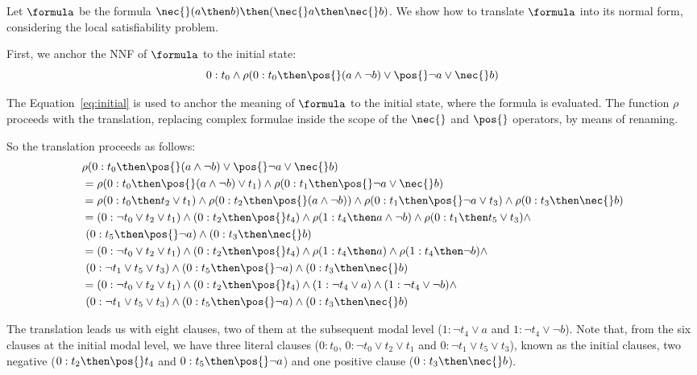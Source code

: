 \begin{example}%
    \label{ex:snf}
    Let $\formula$ be the formula $\nec{}(a \then b) \then (\nec{}a \then \nec{} b)$.
    We show how to translate $\formula$ into its normal form, considering the local
    satisfiability problem.

    First, we anchor the NNF of $\formula$ to the initial state:
    \begin{equation}
        \label{eq:initial}
        0 : t_0 \land \rho(0 : t_0 \then \pos{} (a \land \neg b) \lor \pos{} \neg a \lor \nec{} b)
    \end{equation}

    The Equation~\ref{eq:initial} is used to anchor the meaning of $\formula$ to
    the initial state, where the formula is evaluated. The function $\rho$
    proceeds with the translation, replacing complex formulae inside the
    scope of the $\nec{}$ and $\pos{}$ operators, by means of renaming. 

    So the translation proceeds as follows:
    \begin{align*}
        &\rho(0 : t_0 \then \pos{} (a \land \neg b) \lor \pos{} \neg a \lor \nec{} b) \\
        &= \rho(0: t_0 \then \pos{} (a \land \neg b) \lor t_1) \land \rho(0: t_1 \then \pos{} \neg a \lor \nec{} b) \\
        &= \rho(0: t_0 \then t_2 \lor t_1) \land \rho(0 : t_2 \then \pos {}(a \land \neg b)) \land \rho(0: t_1 \then \pos{} \neg a \lor t_3) \land \rho(0: t_3 \then \nec{} b) \\
        &= (0: \neg t_0 \lor t_2 \lor t_1) \land (0 : t_2 \then \pos {}t_4) \land \rho(1 : t_4 \then a \land \neg b) \land \rho(0: t_1 \then t_5 \lor t_3) \land \\
        &\ (0 : t_5 \then \pos{} \neg a) \land (0: t_3 \then \nec{} b) \\
        &= (0: \neg t_0 \lor t_2 \lor t_1) \land (0 : t_2 \then \pos {}t_4)
        \land \rho(1 : t_4 \then a) \land \rho(1 : t_4 \then \neg b) \land \\ 
        &\ (0: \neg t_1 \lor t_5 \lor t_3) \land (0 : t_5 \then \pos{} \neg a) \land (0: t_3 \then \nec{} b) \\
        &= (0: \neg t_0 \lor t_2 \lor t_1) \land (0 : t_2 \then \pos {}t_4)
        \land (1 : \neg t_4 \lor a) \land (1 : \neg t_4 \lor \neg b) \land \\ 
        &\ (0: \neg t_1 \lor t_5 \lor t_3) \land (0 : t_5 \then \pos{} \neg a) \land (0: t_3 \then \nec{} b) \\
    \end{align*}

    The translation leads us with eight clauses, two of them at the subsequent
    modal level ($1 : \neg t_4 \lor a$ and $1 : \neg t_4 \lor \neg b$). Note
    that, from the six clauses at the initial modal level, we have three literal
    clauses ($0: t_0$, $0: \neg t_0 \lor t_2 \lor t_1$ and $0: \neg t_1 \lor t_5
    \lor t_3$), known as the initial clauses, two negative ($0 : t_2 \then \pos
    {}t_4$ and $0 : t_5 \then \pos{} \neg a$) and one positive clause ($0: t_3
    \then \nec{} b$).
\end{example}

